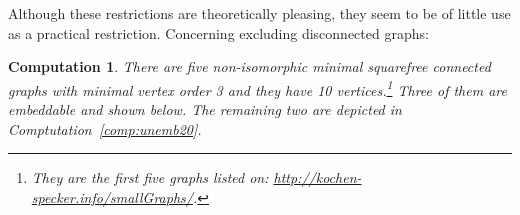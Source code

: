 \documentclass{report}
\newtheorem{comp}{Computation}[section]
\begin{document}
Although these restrictions are theoretically pleasing,
they seem to be of little use as a practical restriction.
Concerning excluding disconnected graphs:
\begin{comp}
    There are five non-isomorphic minimal
    squarefree connected graphs
    with minimal vertex order 3 and they have 10
    vertices.\footnote{They are the first five graphs
            listed on:
    \url{http://kochen-specker.info/smallGraphs/}.}
    Three of them are embeddable and shown below.
    The remaining two
    are depicted in Comptutation~\ref{comp:unemb20}.
\begin{center}
\end{center}
\end{comp}
\end{document}
